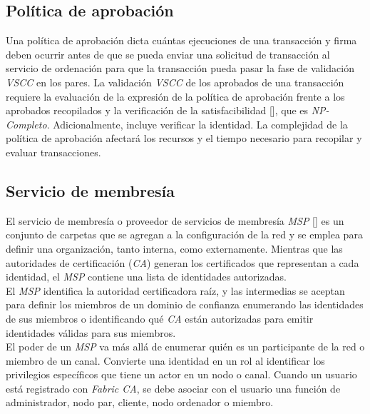 \subsection{Pol\'itica de aprobaci\'on}
Una pol\'itica de aprobaci\'on dicta cu\'antas ejecuciones de una transacci\'on y firma deben ocurrir antes de que se pueda enviar una solicitud de transacci\'on al servicio de ordenaci\'on para que la transacci\'on pueda pasar la fase de validaci\'on \emph{VSCC} en los pares. La validaci\'on \emph{VSCC} de los aprobados de una transacci\'on requiere la evaluaci\'on de la expresi\'on de la pol\'itica de aprobaci\'on frente a los aprobados recopilados y la verificaci\'on de la satisfacibilidad [\cite{gottlieb2002evolutionary}], que es \emph{NP-Completo}. Adicionalmente, incluye verificar la identidad. La complejidad de la pol\'itica de aprobaci\'on afectar\'a los recursos y el tiempo necesario para recopilar y evaluar transacciones.

\subsection{Servicio de membres\'ia}
El servicio de membres\'ia o proveedor de servicios de membres\'ia \emph{MSP} [\cite{MSP}] es un conjunto de carpetas que se agregan a la configuraci\'on de la red y se emplea para definir una organizaci\'on, tanto interna, como externamente. Mientras que las autoridades de certificaci\'on (\emph{CA}) generan los certificados que representan a cada identidad, el \emph{MSP} contiene una lista de identidades autorizadas.\\

El \emph{MSP} identifica la autoridad certificadora ra\'iz, y las intermedias se aceptan para definir los miembros de un dominio de confianza enumerando las identidades de sus miembros o identificando qu\'e \emph{CA} est\'an autorizadas para emitir identidades v\'alidas para sus miembros.\\

El poder de un \emph{MSP} va m\'as all\'a de enumerar qui\'en es un participante de la red o miembro de un canal. Convierte una identidad en un rol al identificar los privilegios espec\'ificos que tiene un actor en un nodo o canal. Cuando un usuario est\'a registrado con \emph{Fabric CA}, se debe asociar con el usuario una funci\'on de administrador, nodo par, cliente, nodo ordenador o miembro.\\ 


